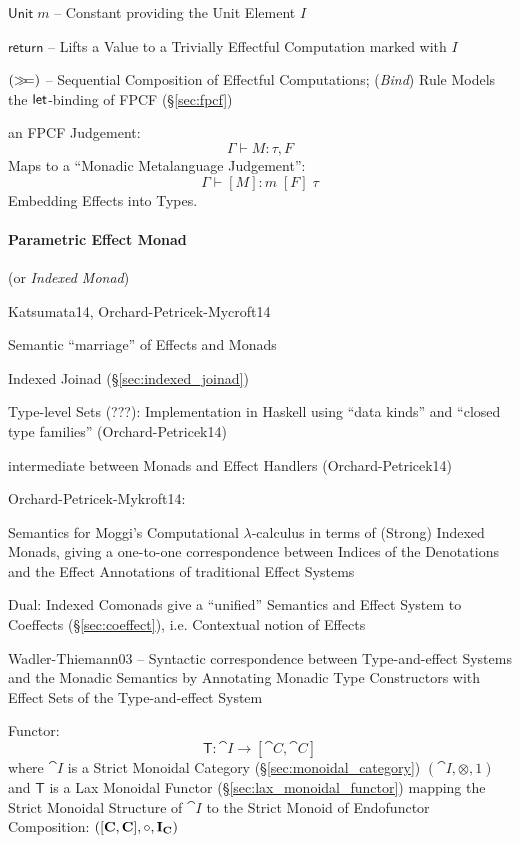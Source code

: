 $\mathsf{Unit}\;m$ -- Constant providing the Unit Element $I$

$\mathsf{return}$ -- Lifts a Value to a Trivially Effectful
Computation marked with $I$

$(\mathsf{\gg\kern-3pt=})$ -- Sequential Composition of Effectful Computations;
(\emph{Bind}) Rule Models the $\mathsf{let}$-binding of FPCF
(\S\ref{sec:fpcf})

an FPCF Judgement:
\[
  \Gamma \vdash M:\tau,F
\]
Maps to a ``Monadic Metalanguage Judgement'': %
\[
  \Gamma \vdash [M]:m\;[F]\;\tau
\]
Embedding Effects into Types. \cite{wadler-thiemann03}




\paragraph{Parametric Effect Monad}
\label{sec:parametric_effect_monad} \hfill

(or \emph{Indexed Monad})

Katsumata14, Orchard-Petricek-Mycroft14

Semantic ``marriage'' of Effects and Monads

Indexed Joinad (\S\ref{sec:indexed_joinad})

Type-level Sets (???): Implementation in Haskell using ``data kinds''
and ``closed type families'' (Orchard-Petricek14) %

intermediate between Monads and Effect Handlers (Orchard-Petricek14)


Orchard-Petricek-Mykroft14:

Semantics for Moggi's Computational $\lambda$-calculus in terms of
(Strong) Indexed Monads, giving a one-to-one correspondence between
Indices of the Denotations and the Effect Annotations of traditional
Effect Systems

Dual: Indexed Comonads give a ``unified'' Semantics and Effect System
to Coeffects (\S\ref{sec:coeffect}), i.e. Contextual notion of Effects

Wadler-Thiemann03 -- Syntactic correspondence between Type-and-effect
Systems and the Monadic Semantics by Annotating Monadic Type
Constructors with Effect Sets of the Type-and-effect System

Functor:
\[
  \mathsf{T} : \cat{I} \rightarrow [\cat{C},\cat{C}]
\]
where $\cat{I}$ is a Strict Monoidal Category
(\S\ref{sec:monoidal_category}) $(\cat{I}, \otimes, 1)$ and
$\mathsf{T}$ is a Lax Monoidal Functor
(\S\ref{sec:lax_monoidal_functor}) mapping the Strict Monoidal
Structure of $\cat{I}$ to the Strict Monoid of Endofunctor
Composition: $([\mathbf{C},\mathbf{C}],\circ,\mathbf{I}_\mathbf{C})$




